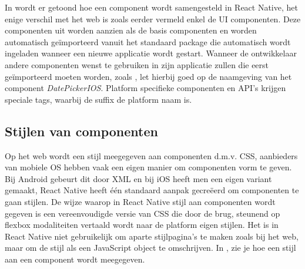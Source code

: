 In   wordt er getoond hoe een component wordt samengesteld in React Native, het enige verschil met het web is zoals eerder vermeld enkel de UI componenten. Deze componenten uit  worden aanzien als de basis componenten en worden automatisch geïmporteerd vanuit het standaard package die automatisch wordt ingeladen wanneer een nieuwe applicatie wordt gestart. Wanneer de ontwikkelaar andere componenten wenst te gebruiken in zijn applicatie zullen die eerst geïmporteerd moeten worden, zoals , let hierbij goed op de naamgeving van het component \emph{DatePickerIOS}. Platform specifieke componenten en API’s krijgen speciale tags, waarbij de suffix de platform naam is. 

\subsection{Stijlen van componenten}
Op het web wordt een stijl meegegeven aan componenten d.m.v. CSS, aanbieders van mobiele OS hebben vaak een eigen manier om componenten vorm te geven. Bij Android gebeurt dit door XML en bij iOS heeft men een eigen variant gemaakt, React Native heeft één standaard aanpak gecreëerd om componenten te gaan stijlen. De wijze waarop in React Native stijl aan componenten wordt gegeven is een vereenvoudigde versie van CSS die door de brug, steunend op flexbox modaliteiten vertaald wordt naar de platform eigen stijlen.
Het is in React Native niet gebruikelijk om aparte stijlpagina’s te maken zoals bij het web, maar om de stijl als een JavaScript object te omschrijven. In , zie je hoe een stijl aan een component wordt meegegeven.
 
